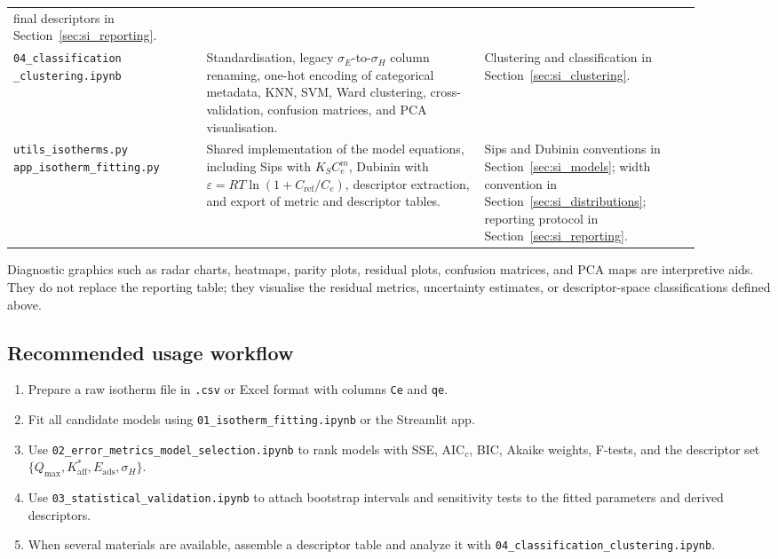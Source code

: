\documentclass[journal=jacsat,manuscript=article]{achemso}
\begin{document}
\begin{table}[H]
\begin{tabular}{p{0.25\linewidth}p{0.36\linewidth}p{0.29\linewidth}}
		final descriptors in Section~\ref{sec:si_reporting}. \\
		\addlinespace
		\makecell[l]{\texttt{04\_classification}\\\texttt{\_clustering.ipynb}} &
		Standardisation, legacy \(\sigma_E\)-to-\(\sigma_H\) column
		renaming, one-hot encoding of categorical metadata, KNN, SVM,
		Ward clustering, cross-validation, confusion matrices, and PCA
		visualisation. &
		Clustering and classification in Section~\ref{sec:si_clustering}. \\
		\addlinespace
		\makecell[l]{\texttt{utils\_isotherms.py}\\
		\texttt{app\_isotherm\_fitting.py}} &
		Shared implementation of the model equations, including Sips with
		\(K_S C_e^m\), Dubinin with
		\(\varepsilon=RT\ln(1+C_{\mathrm{ref}}/C_e)\), descriptor
		extraction, and export of metric and descriptor tables. &
		Sips and Dubinin conventions in Section~\ref{sec:si_models};
		width convention in Section~\ref{sec:si_distributions};
		reporting protocol in Section~\ref{sec:si_reporting}. \\
		\bottomrule
	\end{tabular}
\end{table}

Diagnostic graphics such as radar charts, heatmaps, parity plots, residual
plots, confusion matrices, and PCA maps are interpretive aids. They do not
replace the reporting table; they visualise the residual metrics, uncertainty
estimates, or descriptor-space classifications defined above.

\subsection{Recommended usage workflow}
\label{sec:si_notebook_workflow}

\begin{enumerate}
	\item Prepare a raw isotherm file in \texttt{.csv} or Excel format with
	columns \texttt{Ce} and \texttt{qe}.
	\item Fit all candidate models using
	\texttt{01\_isotherm\_fitting.ipynb} or the Streamlit app.
	\item Use \texttt{02\_error\_metrics\_model\_selection.ipynb} to rank models
	with SSE, AIC$_c$, BIC, Akaike weights, F-tests, and the descriptor set
	$\{Q_{\max}, K_{\mathrm{aff}}^{\ast}, E_{\mathrm{ads}}, \sigma_H\}$.
	\item Use \texttt{03\_statistical\_validation.ipynb} to attach bootstrap
	intervals and sensitivity tests to the fitted parameters and derived
	descriptors.
	\item When several materials are available, assemble a descriptor table and
	analyze it with \texttt{04\_classification\_clustering.ipynb}.
\end{enumerate}
\end{document}
